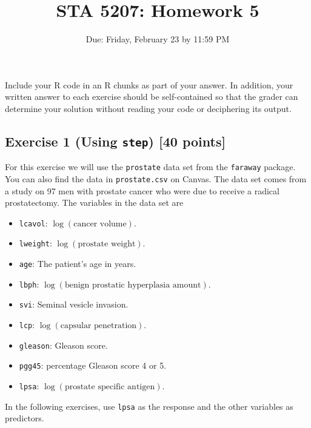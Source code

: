 \documentclass[
]{article}
\title{STA 5207: Homework 5}
\author{}
\date{\vspace{-2.5em}Due: Friday, February 23 by 11:59 PM}
\providecommand{\tightlist}{%
  \setlength{\itemsep}{0pt}\setlength{\parskip}{0pt}}
\begin{document}
\maketitle

Include your R code in an R chunks as part of your answer. In addition,
your written answer to each exercise should be self-contained so that
the grader can determine your solution without reading your code or
deciphering its output.

\hypertarget{exercise-1-using-step-40-points}{%
\subsection{\texorpdfstring{Exercise 1 (Using \texttt{step}) {[}40
points{]}}{Exercise 1 (Using step) {[}40 points{]}}}\label{exercise-1-using-step-40-points}}

For this exercise we will use the \texttt{prostate} data set from the
\texttt{faraway} package. You can also find the data in
\texttt{prostate.csv} on Canvas. The data set comes from a study on 97
men with prostate cancer who were due to receive a radical
prostatectomy. The variables in the data set are

\begin{itemize}
\tightlist
\item
  \texttt{lcavol}: \(\log(\text{cancer volume})\).
\item
  \texttt{lweight}: \(\log(\text{prostate weight})\).
\item
  \texttt{age}: The patient's age in years.
\item
  \texttt{lbph}: \(\log(\text{benign prostatic hyperplasia amount})\).
\item
  \texttt{svi}: Seminal vesicle invasion.
\item
  \texttt{lcp}: \(\log(\text{capsular penetration})\).
\item
  \texttt{gleason}: Gleason score.
\item
  \texttt{pgg45}: percentage Gleason score 4 or 5.
\item
  \texttt{lpsa}: \(\log(\text{prostate specific antigen})\).
\end{itemize}

In the following exercises, use \texttt{lpsa} as the response and the
other variables as predictors.
\end{document}

